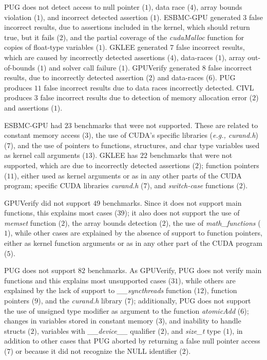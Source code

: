 \documentclass[times, doublespace]{cpeauth}
\begin{document}
PUG does not detect access to null pointer ($1$), data race ($4$), array bounds violation ($1$), and incorrect detected assertion ($1$). ESBMC-GPU generated $3$ false incorrect results, due to assertions included in the kernel, which should return true, but it fails ($2$), and the partial coverage of the \textit{cudaMalloc} function for copies of float-type variables ($1$).
GKLEE generated $7$ false incorrect results, which are caused by incorrectly detected assertions ($4$), data-races ($1$), array out-of-bounds ($1$) and solver call failure ($1$).
GPUVerify generated $8$ false incorrect results, due to incorrectly detected assertion ($2$) and data-races ($6$).
PUG produces $11$ false incorrect results due to data races incorrectly detected.
CIVL produces $3$ false incorrect results due to detection of memory allocation error ($2$) and assertions ($1$).

ESBMC-GPU had $23$ benchmarks that were not supported. These are related to constant memory access ($3$), the use of CUDA's specific libraries (\textit{e.g., curand.h}) ($7$), and the use of pointers to functions, structures, and char type variables used as kernel call arguments ($13$).
GKLEE has $22$ benchmarks that were not supported, which are due to incorrectly detected assertions ($2$); function pointers ($11$), either used as kernel arguments or as in any other parts of the CUDA program; specific CUDA libraries \textit{curand.h} ($7$), and \textit{switch-case} functions ($2$).

GPUVerify did not support $49$ benchmarks. Since it does not support main functions, this explains most cases ($39$); it also does not support the use of \textit{memset} function ($2$), the array bounds detection ($2$), the use of \textit{math\_functions} ($1$), while  other cases are explained by the absence of support to function pointers, either as kernel function arguments or as in any other part of the CUDA program ($5$).

PUG does not support $82$ benchmarks. As GPUVerify, PUG does not verify main functions and this explains most unsupported cases ($31$), while others are explained by the lack of support to \textit{\_\_syncthreads} function ($12$), function pointers ($9$), and the \textit{curand.h} library ($7$); additionally, PUG does not support the use of unsigned type modifier as argument to the function \textit{atomicAdd} ($6$); changes in variables stored in constant memory ($3$), and inability to handle structs ($2$), variables with \textit{\_\_device\_\_} qualifier ($2$), and \textit{size\_t} type ($1$), in addition to other cases that PUG aborted by returning a false null pointer access ($7$) or because it did not recognize the NULL identifier ($2$).
\end{document}
